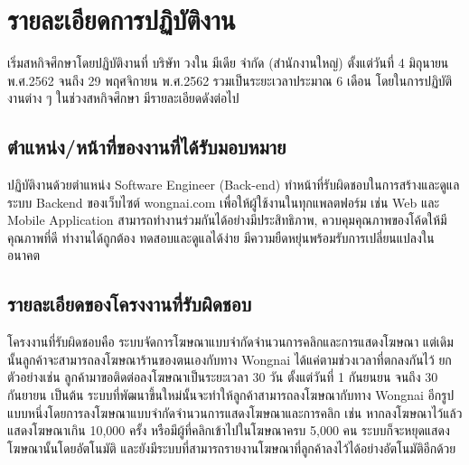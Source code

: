 \chapter{รายละเอียดการปฏิบัติงาน}
\label{chapter:related-theory}

เริ่มสหกิจศึกษาโดยปฏิบัติงานที่ บริษัท วงใน มีเดีย จำกัด (สำนักงานใหญ่) ตั้งแต่วันที่ 4 มิถุนายน พ.ศ.2562 จนถึง 29 พฤศจิกายน พ.ศ.2562 รวมเป็นระยะเวลาประมาณ 6 เดือน โดยในการปฏิบัติงานต่าง ๆ ในช่วงสหกิจศึกษา มีรายละเอียดดังต่อไป

\section{ตำแหน่ง/หน้าที่ของงานที่ได้รับมอบหมาย}
ปฏิบัติงานด้วยตำแหน่ง Software Engineer (Back-end) ทำหน้าที่รับผิดชอบในการสร้างและดูแลระบบ Backend ของเว็บไซต์ wongnai.com เพื่อให้ผู้ใช้งานในทุกแพลตฟอร์ม เช่น Web และ Mobile Application สามารถทำงานร่วมกันได้อย่างมีประสิทธิภาพ, ควบคุมคุณภาพของโค้ดให้มีคุณภาพที่ดี ทำงานได้ถูกต้อง ทดสอบและดูแลได้ง่าย มีความยืดหยุ่นพร้อมรับการเปลี่ยนแปลงในอนาคต

\section{รายละเอียดของโครงงานที่รับผิดชอบ}
โครงงานที่รับผิดชอบคือ ระบบจัดการโฆษณาแบบจำกัดจำนวนการคลิกและการแสดงโฆษณา แต่เดิมนั้นลูกค้าจะสามารถลงโฆษณาร้านของตนเองกับทาง Wongnai ได้แค่ตามช่วงเวลาที่ตกลงกันไว้ ยกตัวอย่างเช่น ลูกค้ามาขอติดต่อลงโฆษณาเป็นระยะเวลา 30 วัน ตั้งแต่วันที่ 1 กันยนยน จนถึง 30 กันยายน เป็นต้น ระบบที่พัฒนาขึ้นใหม่นั้นจะทำให้ลูกค้าสามารถลงโฆษณากับทาง Wongnai อีกรูปแบบหนึ่งโดยการลงโฆษณาแบบจำกัดจำนวนการแสดงโฆษณาและการคลิก เช่น หากลงโฆษณาไว้แล้วแสดงโฆษณาเกิน 10,000 ครั้ง หรือมีผู้ที่คลิกเข้าไปในโฆษณาครบ 5,000 คน ระบบก็จะหยุดแสดงโฆษณานั้นโดยอัตโนมัติ และยังมีระบบที่สามารถรายงานโฆษณาที่ลูกค้าลงไว้ได้อย่างอัตโนมัติอีกด้วย

